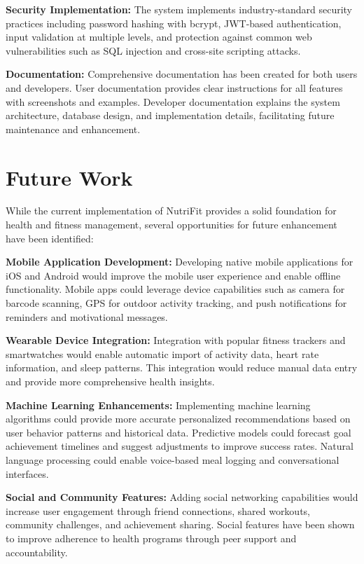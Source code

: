 \textbf{Security Implementation:} The system implements industry-standard security practices including password hashing with bcrypt, JWT-based authentication, input validation at multiple levels, and protection against common web vulnerabilities such as SQL injection and cross-site scripting attacks.

\textbf{Documentation:} Comprehensive documentation has been created for both users and developers. User documentation provides clear instructions for all features with screenshots and examples. Developer documentation explains the system architecture, database design, and implementation details, facilitating future maintenance and enhancement.

\section{Future Work}

While the current implementation of NutriFit provides a solid foundation for health and fitness management, several opportunities for future enhancement have been identified:

\textbf{Mobile Application Development:} Developing native mobile applications for iOS and Android would improve the mobile user experience and enable offline functionality. Mobile apps could leverage device capabilities such as camera for barcode scanning, GPS for outdoor activity tracking, and push notifications for reminders and motivational messages.

\textbf{Wearable Device Integration:} Integration with popular fitness trackers and smartwatches would enable automatic import of activity data, heart rate information, and sleep patterns. This integration would reduce manual data entry and provide more comprehensive health insights.

\textbf{Machine Learning Enhancements:} Implementing machine learning algorithms could provide more accurate personalized recommendations based on user behavior patterns and historical data. Predictive models could forecast goal achievement timelines and suggest adjustments to improve success rates. Natural language processing could enable voice-based meal logging and conversational interfaces.

\textbf{Social and Community Features:} Adding social networking capabilities would increase user engagement through friend connections, shared workouts, community challenges, and achievement sharing. Social features have been shown to improve adherence to health programs through peer support and accountability.

